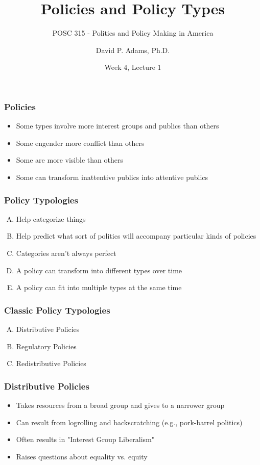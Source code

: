 \documentclass{beamer}
\title{Policies and Policy Types}
\subtitle{POSC 315 - Politics and Policy Making in America}
\author{David P. Adams, Ph.D.}
\date{Week 4, Lecture 1}
\begin{document}
\frame{\titlepage}

\begin{frame}
\frametitle{Policies}
\begin{itemize}
    \item Some types involve more interest groups and publics than others
    \item Some engender more conflict than others
    \item Some are more visible than others
    \item Some can transform inattentive publics into attentive publics
\end{itemize}
\end{frame}

\begin{frame}
\frametitle{Policy Typologies}
\begin{enumerate}[A.]
    \item Help categorize things
    \item Help predict what sort of politics will accompany particular kinds of policies
    \item Categories aren't always perfect
    \item A policy can transform into different types over time
    \item A policy can fit into multiple types at the same time
\end{enumerate}
\end{frame}

\begin{frame}
\frametitle{Classic Policy Typologies}
\begin{enumerate}[A.]
    \item Distributive Policies
    \item Regulatory Policies
    \item Redistributive Policies
\end{enumerate}
\end{frame}

\begin{frame}
\frametitle{Distributive Policies}
\begin{itemize}
    \item Takes resources from a broad group and gives to a narrower group
    \item Can result from logrolling and backscratching (e.g., pork-barrel politics)
    \item Often results in "Interest Group Liberalism"
    \item Raises questions about equality vs. equity
\end{itemize}
\end{frame}
\end{document}
